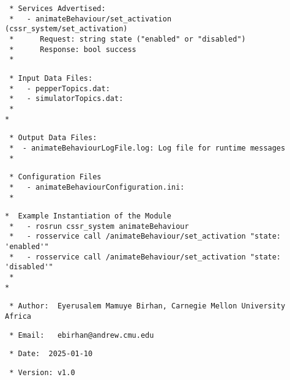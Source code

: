 \documentclass{CSSRforAfrica}
\newcommand{\checkboxChecked}{\fbox{\ding{51}}} %
\begin{document}
\begin{description}
\item[\checkboxChecked] 
 {\small 
\begin{verbatim}                    
 * Services Advertised:
 *   - animateBehaviour/set_activation (cssr_system/set_activation)
 *      Request: string state ("enabled" or "disabled")
 *      Response: bool success
 *
\end{verbatim}}

\item[\checkboxChecked] 
 {\small 
\begin{verbatim}
 * Input Data Files:
 *   - pepperTopics.dat:
 *   - simulatorTopics.dat:
 * 
*
\end{verbatim}}

\item[\checkboxChecked] 
 {\small 
\begin{verbatim}
 * Output Data Files:
 *  - animateBehaviourLogFile.log: Log file for runtime messages
 * 
\end{verbatim}}

\item[\checkboxChecked] 
 {\small 
\begin{verbatim}
 * Configuration Files
 *   - animateBehaviourConfiguration.ini:
 *
\end{verbatim}}

\newpage
\item[\checkboxChecked] 
 {\small 
\begin{verbatim}
*  Example Instantiation of the Module
 *   - rosrun cssr_system animateBehaviour
 *   - rosservice call /animateBehaviour/set_activation "state: 'enabled'"
 *   - rosservice call /animateBehaviour/set_activation "state: 'disabled'"
 *
*
\end{verbatim}}

\item[\checkboxChecked] 
 {\small 
\begin{verbatim}
 * Author:  Eyerusalem Mamuye Birhan, Carnegie Mellon University Africa
\end{verbatim}}

\item[\checkboxChecked] 
 {\small 
\begin{verbatim}
 * Email:   ebirhan@andrew.cmu.edu
\end{verbatim}}

\item[\checkboxChecked] 
 {\small 
\begin{verbatim}
 * Date:  2025-01-10
\end{verbatim}}

\item[\checkboxChecked] 
 {\small 
\begin{verbatim}
 * Version: v1.0
\end{verbatim}}


\end{description}
\end{document}
